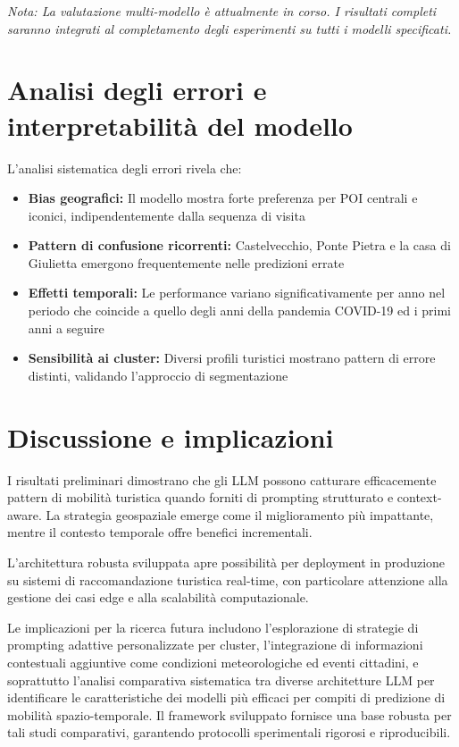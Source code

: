 \textit{Nota: La valutazione multi-modello \`e attualmente in corso. I risultati completi saranno integrati al completamento degli esperimenti su tutti i modelli specificati.}

\section{Analisi degli errori e interpretabilità del modello}

L'analisi sistematica degli errori rivela che:

\begin{itemize}
\item \textbf{Bias geografici:} Il modello mostra forte preferenza per POI centrali e iconici, indipendentemente dalla sequenza di visita
\item \textbf{Pattern di confusione ricorrenti:} Castelvecchio, Ponte Pietra e la casa di Giulietta emergono frequentemente nelle predizioni errate
\item \textbf{Effetti temporali:} Le performance variano significativamente per anno nel periodo che coincide a quello degli anni della pandemia COVID-19 ed i primi anni a seguire
\item \textbf{Sensibilità ai cluster:} Diversi profili turistici mostrano pattern di errore distinti, validando l'approccio di segmentazione
\end{itemize}

\section{Discussione e implicazioni}

I risultati preliminari dimostrano che gli LLM possono catturare efficacemente pattern di mobilità turistica quando forniti di prompting strutturato e context-aware. La strategia geospaziale emerge come il miglioramento più impattante, mentre il contesto temporale offre benefici incrementali.

L'architettura robusta sviluppata apre possibilità per deployment in produzione su sistemi di raccomandazione turistica real-time, con particolare attenzione alla gestione dei casi edge e alla scalabilità computazionale.

Le implicazioni per la ricerca futura includono l'esplorazione di strategie di prompting adattive personalizzate per cluster, l'integrazione di informazioni contestuali aggiuntive come condizioni meteorologiche ed eventi cittadini, e soprattutto l'analisi comparativa sistematica tra diverse architetture LLM per identificare le caratteristiche dei modelli più efficaci per compiti di predizione di mobilità spazio-temporale. Il framework sviluppato fornisce una base robusta per tali studi comparativi, garantendo protocolli sperimentali rigorosi e riproducibili.